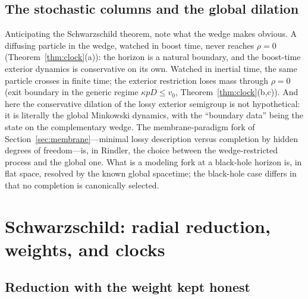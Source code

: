 \documentclass[11pt]{article}
\theoremstyle{definition}
\theoremstyle{remark}
\begin{document}
\subsection{The stochastic columns and the global dilation}

Anticipating the Schwarzschild theorem, note what the wedge makes
obvious. A diffusing particle in the wedge, watched in boost time,
never reaches $\rho=0$ (Theorem~\ref{thm:clock}(a)): the horizon is a
natural boundary, and the boost-time
exterior dynamics is conservative on its own. Watched in inertial
time, the same particle crosses in finite time; the exterior
restriction loses mass through $\rho=0$ (exit boundary in the generic
regime $\kappa pD\le v_0$, Theorem~\ref{thm:clock}(b,c)). And here the conservative dilation of
the lossy exterior semigroup is not hypothetical: it is literally the
global Minkowski dynamics, with the ``boundary data'' being the state
on the complementary wedge. The membrane-paradigm fork of
Section~\ref{sec:membrane}---minimal lossy description versus
completion by hidden degrees of freedom---is, in Rindler, the choice
between the wedge-restricted process and the global one. What is a
modeling fork at a black-hole horizon is, in flat space, resolved by
the known global spacetime; the black-hole case differs in that no
completion is canonically selected.

\section{Schwarzschild: radial reduction, weights, and clocks}
\label{sec:schw}

\subsection{Reduction with the weight kept honest}
\end{document}
